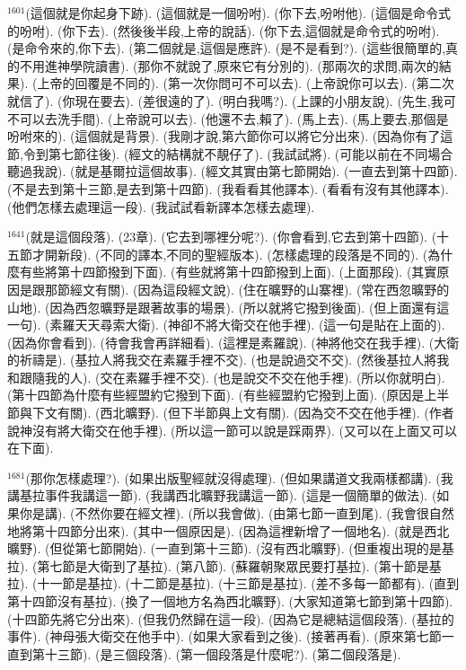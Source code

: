 \documentclass{book}
\begin{document}
$^{1601}$(這個就是你起身下跡).
(這個就是一個吩咐).
(你下去,吩咐他).
(這個是命令式的吩咐).
(你下去).
(然後後半段,上帝的說話).
(你下去,這個就是命令式的吩咐).
(是命令來的,你下去).
(第二個就是,這個是應許).
(是不是看到?).
(這些很簡單的,真的不用進神學院讀書).
(那你不就說了,原來它有分別的).
(那兩次的求問,兩次的結果).
(上帝的回覆是不同的).
(第一次你問可不可以去).
(上帝說你可以去).
(第二次就信了).
(你現在要去).
(差很遠的了).
(明白我嗎?).
(上課的小朋友說).
(先生,我可不可以去洗手間).
(上帝說可以去).
(他還不去,賴了).
(馬上去).
(馬上要去,那個是吩咐來的).
(這個就是背景).
(我剛才說,第六節你可以將它分出來).
(因為你有了這節,令到第七節往後).
(經文的結構就不靚仔了).
(我試試將).
(可能以前在不同場合聽過我說).
(就是基爾拉這個故事).
(經文其實由第七節開始).
(一直去到第十四節).
(不是去到第十三節,是去到第十四節).
(我看看其他譯本).
(看看有沒有其他譯本).
(他們怎樣去處理這一段).
(我試試看新譯本怎樣去處理).

$^{1641}$(就是這個段落).
(23章).
(它去到哪裡分呢?).
(你會看到,它去到第十四節).
(十五節才開新段).
(不同的譯本,不同的聖經版本).
(怎樣處理的段落是不同的).
(為什麼有些將第十四節撥到下面).
(有些就將第十四節撥到上面).
(上面那段).
(其實原因是跟那節經文有關).
(因為這段經文說).
(住在曠野的山寨裡).
(常在西忽曠野的山地).
(因為西忽曠野是跟著故事的場景).
(所以就將它撥到後面).
(但上面還有這一句).
(素羅天天尋索大衛).
(神卻不將大衛交在他手裡).
(這一句是貼在上面的).
(因為你會看到).
(待會我會再詳細看).
(這裡是素羅說).
(神將他交在我手裡).
(大衛的祈禱是).
(基拉人將我交在素羅手裡不交).
(也是說過交不交).
(然後基拉人將我和跟隨我的人).
(交在素羅手裡不交).
(也是說交不交在他手裡).
(所以你就明白).
(第十四節為什麼有些經盟約它撥到下面).
(有些經盟約它撥到上面).
(原因是上半節與下文有關).
(西北曠野).
(但下半節與上文有關).
(因為交不交在他手裡).
(作者說神沒有將大衛交在他手裡).
(所以這一節可以說是踩兩界).
(又可以在上面又可以在下面).

$^{1681}$(那你怎樣處理?).
(如果出版聖經就沒得處理).
(但如果講道文我兩樣都講).
(我講基拉事件我講這一節).
(我講西北曠野我講這一節).
(這是一個簡單的做法).
(如果你是講).
(不然你要在經文裡).
(所以我會做).
(由第七節一直到尾).
(我會很自然地將第十四節分出來).
(其中一個原因是).
(因為這裡新增了一個地名).
(就是西北曠野).
(但從第七節開始).
(一直到第十三節).
(沒有西北曠野).
(但重複出現的是基拉).
(第七節是大衛到了基拉).
(第八節).
(蘇羅朝聚眾民要打基拉).
(第十節是基拉).
(十一節是基拉).
(十二節是基拉).
(十三節是基拉).
(差不多每一節都有).
(直到第十四節沒有基拉).
(換了一個地方名為西北曠野).
(大家知道第七節到第十四節).
(十四節先將它分出來).
(但我仍然歸在這一段).
(因為它是總結這個段落).
(基拉的事件).
(神母張大衛交在他手中).
(如果大家看到之後).
(接著再看).
(原來第七節一直到第十三節).
(是三個段落).
(第一個段落是什麼呢?).
(第二個段落是).
\end{document}
